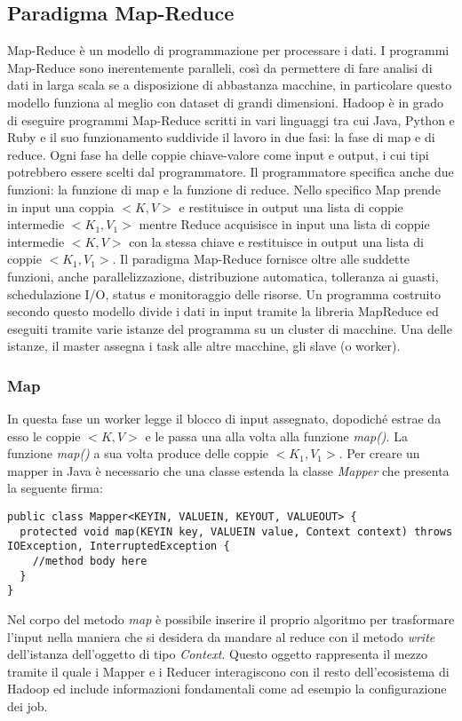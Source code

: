 \subsection{Paradigma Map-Reduce}
Map-Reduce è un modello di programmazione per processare i dati. I programmi Map-Reduce sono inerentemente paralleli, così da permettere di fare analisi di dati in larga scala se a disposizione di abbastanza macchine, in particolare questo modello funziona al meglio con dataset di grandi dimensioni. Hadoop è in grado di eseguire programmi Map-Reduce scritti in vari linguaggi tra cui Java, Python e Ruby e il suo funzionamento suddivide il lavoro in due fasi: la fase di map e di reduce. Ogni fase ha delle coppie chiave-valore come input e output, i cui tipi potrebbero essere scelti dal programmatore. Il programmatore specifica anche due funzioni: la funzione di map e la funzione di reduce. Nello specifico Map prende in input una coppia $<K,V>$ e restituisce in output una lista di coppie intermedie $<K_1,V_1>$ mentre Reduce acquisisce in input una lista di coppie intermedie $<K,V>$ con la stessa chiave e restituisce in output una lista di coppie $<K_1,V_1>$. Il paradigma Map-Reduce fornisce oltre alle suddette funzioni, anche parallelizzazione, distribuzione automatica, tolleranza ai guasti, schedulazione I/O, status e monitoraggio delle risorse. Un programma costruito secondo questo modello divide i dati in input tramite la libreria MapReduce ed eseguiti tramite varie istanze del programma su un cluster di macchine. Una delle istanze, il master assegna i task alle altre macchine, gli slave (o worker).
\subsubsection{Map}
In questa fase un worker legge il blocco di input assegnato, dopodiché estrae da esso le coppie $<K,V>$ e le passa una alla volta alla funzione \textit{map()}. La funzione \textit{map()} a sua volta produce delle coppie $<K_1,V_1>$. Per creare un mapper in Java è necessario che una classe estenda la classe \textit{Mapper} che presenta la seguente firma:
\begin{lstlisting}
public class Mapper<KEYIN, VALUEIN, KEYOUT, VALUEOUT> {
  protected void map(KEYIN key, VALUEIN value, Context context) throws IOException, InterruptedException {
    //method body here
  }
}
\end{lstlisting}
Nel corpo del metodo \textit{map} è possibile inserire il proprio algoritmo per trasformare l'input nella maniera che si desidera da mandare al reduce con il metodo \textit{write} dell'istanza dell'oggetto di tipo \textit{Context}. Questo oggetto rappresenta il mezzo tramite il quale i Mapper e i Reducer interagiscono con il resto dell'ecosistema di Hadoop ed include informazioni fondamentali come ad esempio la configurazione dei job.

